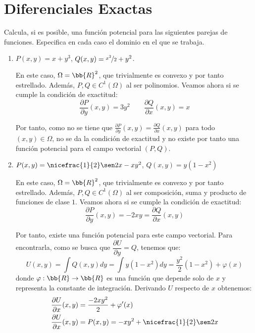 \section{Diferenciales Exactas}

\begin{ejercicio} \label{ej:3.1}
    Calcula, si es posible, una función potencial para las siguientes parejas de funciones. Especifica en cada caso el
    dominio en el que se trabaja.
    \begin{enumerate}
        \item $P(x, y) = x + y^3$, $Q(x, y) = \nicefrac{x^2}{2} + y^2$.
        
        En este caso, $\Omega=\bb{R}^2$, que trivialmente es convexo y por tanto estrellado. Además, $P,Q\in C^1(\Omega)$ al ser polinomios. Veamos ahora si se cumple la condición de exactitud:
        \begin{equation*}
            \frac{\partial P}{\partial y}(x,y) = 3y^2 \qquad
            \frac{\partial Q}{\partial x}(x,y)= x
        \end{equation*}

        Por tanto, como no se tiene que $\frac{\partial P}{\partial y}(x,y)=\frac{\partial Q}{\partial x}(x,y)$ para todo $(x,y)\in\Omega$, no se da la condición de exactitud y no existe por tanto una función potencial para el campo vectorial $(P,Q)$.
        \item $P(x, y) = \nicefrac{1}{2} \sen 2x - xy^2$, $Q(x, y) = y(1 - x^2)$
        
        En este caso, $\Omega=\bb{R}^2$, que trivialmente es convexo y por tanto estrellado. Además, $P,Q\in C^1(\Omega)$ al ser composición, suma y producto de funciones de clase $1$. Veamos ahora si se cumple la condición de exactitud:
        \begin{equation*}
            \frac{\partial P}{\partial y}(x,y) = -2xy = \frac{\partial Q}{\partial x}(x,y)
        \end{equation*}

        Por tanto, existe una función potencial para este campo vectorial. Para encontrarla, como se busca que $\dfrac{\partial U}{\partial y}=Q$, tenemos que:
        \begin{equation*}
            U(x,y)=\int Q(x,y)dy =
            \int y(1-x^2)dy = \frac{y^2}{2}(1-x^2)+\varphi(x)
        \end{equation*}
        donde $\varphi:\bb{R}\to\bb{R}$ es una función que depende solo de $x$ y representa la constante de integración. Derivando $U$ respecto de $x$ obtenemos:
        \begin{align*}
            \frac{\partial U}{\partial x}(x,y)&=\frac{-2xy^2}{2}+\varphi'(x)\\
            \frac{\partial U}{\partial x}(x,y)&=P(x,y)=-xy^2+\nicefrac{1}{2}\sen 2x
        \end{align*}


\end{enumerate}
\end{ejercicio}
